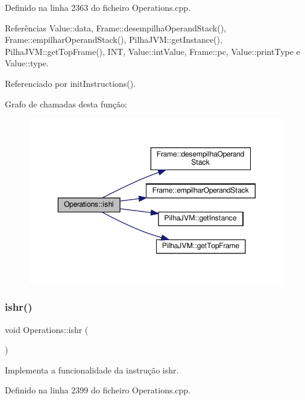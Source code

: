 Definido na linha 2363 do ficheiro Operations.\+cpp.



Referências Value\+::data, Frame\+::desempilha\+Operand\+Stack(), Frame\+::empilhar\+Operand\+Stack(), Pilha\+J\+V\+M\+::get\+Instance(), Pilha\+J\+V\+M\+::get\+Top\+Frame(), I\+NT, Value\+::int\+Value, Frame\+::pc, Value\+::print\+Type e Value\+::type.



Referenciado por init\+Instructions().

Grafo de chamadas desta função\+:
\nopagebreak
\begin{figure}[H]
\begin{center}
\leavevmode
\includegraphics[width=350pt]{classOperations_a3139bbe41519fb4761ecd7e2a8ddb994_cgraph}
\end{center}
\end{figure}
\mbox{\label{classOperations_aa67d92582121939b307658d417b34d3c}} 
\subsubsection{\texorpdfstring{ishr()}{ishr()}}
{\footnotesize\ttfamily void Operations\+::ishr (\begin{DoxyParamCaption}{ }\end{DoxyParamCaption})\hspace{0.3cm}{\ttfamily [private]}}



Implementa a funcionalidade da instrução ishr. 



Definido na linha 2399 do ficheiro Operations.\+cpp.



